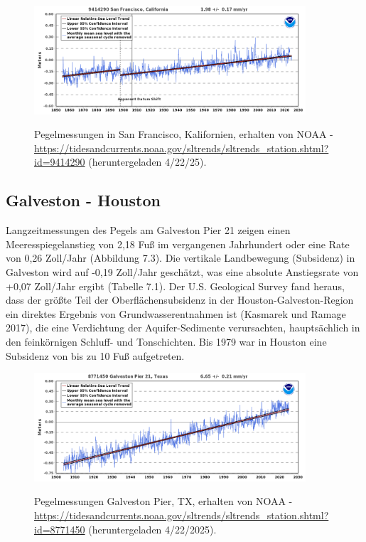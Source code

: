 \documentclass[12pt,paper=a4,DIV=12,parskip=never,chapterprefix=false,headings=standardclasses]{scrreprt}
\begin{document}
\begin{figure}[H]
\begin{center}
\includegraphics[width=0.9\textwidth]{bilder/bilderKlima-0069.png}\\[1cm]
\end{center}
\caption{Pegelmessungen in San Francisco, Kalifornien, erhalten von NOAA - \url{https://tidesandcurrents.noaa.gov/sltrends/sltrends_station.shtml?id=9414290} (heruntergeladen 4/22/25).}
\end{figure}

\subsection{Galveston - Houston}
Langzeitmessungen des Pegels am Galveston Pier 21 zeigen einen Meeresspiegelanstieg von 2,18 Fuß im vergangenen Jahrhundert oder eine Rate von 0,26 Zoll/Jahr (Abbildung 7.3). Die vertikale Landbewegung (Subsidenz) in Galveston wird auf -0,19 Zoll/Jahr geschätzt, was eine absolute Anstiegsrate von +0,07 Zoll/Jahr ergibt (Tabelle 7.1). Der U.S. Geological Survey fand heraus, dass der größte Teil der Oberflächensubsidenz in der Houston-Galveston-Region ein direktes Ergebnis von Grundwasserentnahmen ist (Kasmarek und Ramage 2017), die eine Verdichtung der Aquifer-Sedimente verursachten, hauptsächlich in den feinkörnigen Schluff- und Tonschichten. Bis 1979 war in Houston eine Subsidenz von bis zu 10 Fuß aufgetreten.

\begin{figure}[H]
\begin{center}
\includegraphics[width=0.9\textwidth]{bilder/bilderKlima-0070.png}\\[1cm]
\end{center}
\caption{Pegelmessungen Galveston Pier, TX, erhalten von NOAA - \url{https://tidesandcurrents.noaa.gov/sltrends/sltrends_station.shtml?id=8771450} (heruntergeladen 4/22/2025).}
\end{figure}
\end{document}
